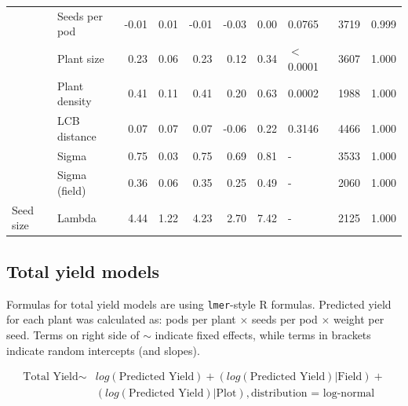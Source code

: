\documentclass[12pt]{article} %
\begin{document}
\begin{longtable}{l|l|r|r|r|r|r|l|r|r}
\cline{2-10}
 & Seeds per pod & -0.01 & 0.01 & -0.01 & -0.03 & 0.00 & 0.0765 & 3719 & 0.999\\
\cline{2-10}
 & Plant size & 0.23 & 0.06 & 0.23 & 0.12 & 0.34 & $<$0.0001 & 3607 & 1.000\\
\cline{2-10}
 & Plant density & 0.41 & 0.11 & 0.41 & 0.20 & 0.63 & 0.0002 & 1988 & 1.000\\
\cline{2-10}
 & LCB distance & 0.07 & 0.07 & 0.07 & -0.06 & 0.22 & 0.3146 & 4466 & 1.000\\
\cline{2-10}
 & Sigma & 0.75 & 0.03 & 0.75 & 0.69 & 0.81 & - & 3533 & 1.000\\
\cline{2-10}
 & Sigma (field) & 0.36 & 0.06 & 0.35 & 0.25 & 0.49 & - & 2060 & 1.000\\
\cline{2-10}
\multirow{-9}{*}{\raggedright\arraybackslash Seed size} & Lambda & 4.44 & 1.22 & 4.23 & 2.70 & 7.42 & - & 2125 & 1.000\\
\hline
\end{longtable}
\endgroup{}


\clearpage

\subsection*{Total yield models}

Formulas for total yield models are  using \texttt{lmer}-style R formulas. Predicted yield for each plant was calculated as: pods per plant $\times$ seeds per pod $\times$ weight per seed. Terms on right side of $\sim$ indicate fixed effects, while terms in brackets indicate random intercepts (and slopes). 

\begin{align*}
    \text{Total Yield} \sim & log(\text{Predicted Yield}) + (log(\text{Predicted Yield})|\text{Field}) + \\
    & (log(\text{Predicted Yield})|\text{Plot}), \text{distribution = log-normal} \\
\end{align*}
\end{document}
